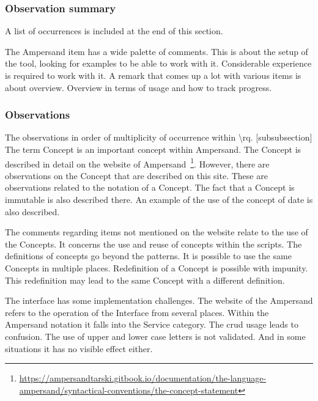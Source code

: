 \subsubsection{Observation summary}
A list of occurrences is included at the end of this section.

The Ampersand item has a wide palette of comments.
This is about the setup of the tool, looking for examples to be able to work with it.
Considerable experience is required to work with it.
A remark that comes up a lot with various items is about overview.
Overview in terms of usage and how to track progress.

\subsubsection{Observations }
The observations in order of multiplicity of occurrence within \acrshort{\rq}.
[subsubsection]
The term Concept is an important concept within Ampersand.
The Concept is described in detail on the website of Ampersand~\footnote{\url{https://ampersandtarski.gitbook.io/documentation/the-language-ampersand/syntactical-conventions/the-concept-statement}}.
However, there are observations on the Concept that are described on this site.
These are observations related to the notation of a Concept.
The fact that a Concept is immutable is also described there.
An example of the use of the concept of date is also described.

The comments regarding items not mentioned on the website relate to the use of the Concepts.
It concerns the use and reuse of concepts within the scripts.
The definitions of concepts go beyond the patterns.
It is possible to use the same Concepts in multiple places.
Redefinition of a Concept is possible with impunity.
This redefinition may lead to the same Concept with a different definition.

The interface has some implementation challenges.
The website of the Ampersand refers to the operation of the Interface from several places.
Within the Ampersand notation it falls into the Service category.
The \acrlong{crud} usage leads to confusion.
The use of upper and lower case letters is not validated.
And in some situations it has no visible effect either.

